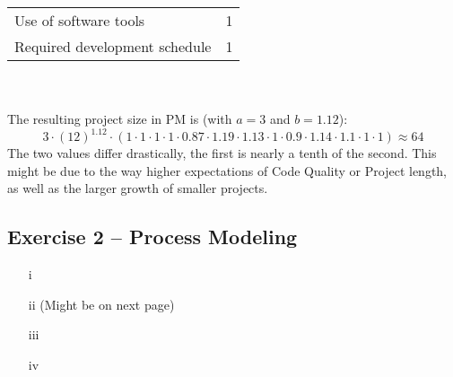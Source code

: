 \documentclass{scrartcl}
\begin{document}
\begin{itemize}
\begin{tabular}{l | c}
		Use of software tools & 1\\
		Required development schedule & 1\\
	\end{tabular}\\\\
	The resulting project size in PM is (with $a=3$ and $b=1.12$):
	\[3 \cdot (12)^{1.12}\cdot (1\cdot 1 \cdot 1 \cdot 1 \cdot 0.87 \cdot 1.19 \cdot 1.13 \cdot 1 \cdot 0.9 \cdot 1.14 \cdot 1.1 \cdot 1 \cdot 1) \approx 64\]
	The two values differ drastically, the first is nearly a tenth of the second.
        This might be due to the way higher expectations of Code Quality or Project length, as well as the larger growth of smaller projects.
\end{itemize}

\subsection*{Exercise 2 – Process Modeling}

\begin{itemize}
    \item[i] %
    \item[ii] (Might be on next page)
        
    \item[iii] %
    \item[iv] %
\end{itemize}
\end{document}
